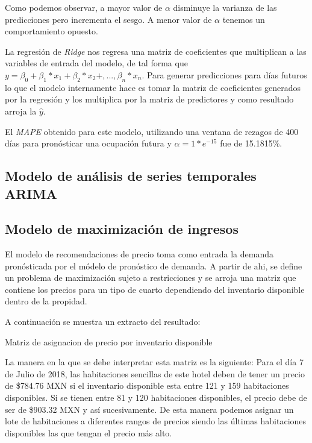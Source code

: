 Como podemos observar, a mayor valor de $\alpha$ disminuye la varianza de las predicciones pero incrementa el sesgo. A menor valor de $\alpha$ tenemos un comportamiento opuesto.

La regresión de \emph{Ridge} nos regresa una matriz de coeficientes que multiplican a las variables de entrada del modelo, de tal forma que $y=\beta_0 + \beta_1*x_1 + \beta_2*x_2 + ,..., \beta_n*x_n$. Para generar predicciones para días futuros lo que el modelo internamente hace es tomar la matriz de coeficientes generados por la regresión y los multiplica por la matriz de predictores y como resultado arroja la $\hat{y}$.

El \emph{MAPE} obtenido para este modelo, utilizando una ventana de rezagos de 400 días  para pronósticar una ocupación futura y $\alpha = 1*e^{-15}$ fue de 15.1815\%.

\subsection*{Modelo de análisis de series temporales ARIMA}

\subsection*{Modelo de maximización de ingresos}

El modelo de recomendaciones de precio toma como entrada la demanda pronósticada por el módelo de pronóstico de demanda. A partir de ahi, se define un problema de maximización sujeto a restricciones y se arroja una matriz que contiene los precios para un tipo de cuarto dependiendo del inventario disponible dentro de la propidad.

A continuación se muestra un extracto del resultado:

\begin{table}[H]
  \centering
  \par
  \caption{Matriz de asignacion de precio por inventario disponible}
\end{table}

La manera en la que se debe interpretar esta matriz es la siguiente: Para el día 7 de Julio de 2018, las habitaciones sencillas de este hotel deben de tener un precio de \$784.76 MXN si el inventario disponible esta entre 121 y 159 habitaciones disponibles. Si se tienen entre 81 y 120 habitaciones disponibles, el precio debe de ser de \$903.32 MXN y así sucesivamente. De esta manera podemos asignar un lote de habitaciones a diferentes rangos de precios siendo las últimas habitaciones disponibles las que tengan el precio más alto.



